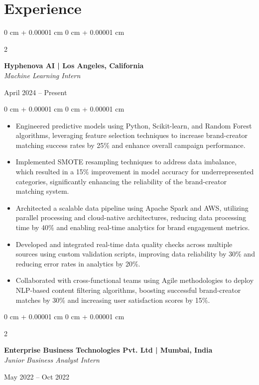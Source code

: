 \documentclass[9pt, letterpaper]{article}
\newenvironment{highlights}{
    \begin{itemize}[
        topsep=0.03 cm,  %
        parsep=0.03 cm,  %
        partopsep=0pt,
        itemsep=0pt,
        leftmargin=0 cm + 8pt %
    ]
    \justifying
}{
    \end{itemize}
}
\newenvironment{onecolentry}{
    \begin{adjustwidth}{
        0 cm + 0.00001 cm
    }{
        0 cm + 0.00001 cm
    }
}{
    \end{adjustwidth}
}
\newenvironment{twocolentry}[2][]{
    \onecolentry
    \def\secondColumn{#2}
    \setcolumnwidth{\fill, 4.3 cm}  %
    \begin{paracol}{2}
}{
    \switchcolumn \raggedleft \secondColumn
    \end{paracol}
    \endonecolentry
}
\begin{document}
\section{Experience}

\begin{twocolentry}{
    April 2024 – Present
}
    \textbf{Hyphenova AI | Los Angeles, California}\\
    \textit{Machine Learning Intern}
\end{twocolentry}

\vspace{0.05 cm}

\begin{onecolentry}
    \begin{highlights}
        \item Engineered predictive models using Python, Scikit-learn, and Random Forest algorithms, leveraging feature selection techniques to increase brand-creator matching success rates by 25\% and enhance overall campaign performance.
        \item Implemented SMOTE resampling techniques to address data imbalance, which resulted in a 15\% improvement in model accuracy for underrepresented categories, significantly enhancing the reliability of the brand-creator matching system.
        \item Architected a scalable data pipeline using Apache Spark and AWS, utilizing parallel processing and cloud-native architectures, reducing data processing time by 40\% and enabling real-time analytics for brand engagement metrics.
        \item Developed and integrated real-time data quality checks across multiple sources using custom validation scripts, improving data reliability by 30\% and reducing error rates in analytics by 20\%.
        \item Collaborated with cross-functional teams using Agile methodologies to deploy NLP-based content filtering algorithms, boosting successful brand-creator matches by 30\% and increasing user satisfaction scores by 15\%.
    \end{highlights}
\end{onecolentry}

\vspace{0.15 cm}

\begin{twocolentry}{
    May 2022 – Oct 2022
}
    \textbf{Enterprise Business Technologies Pvt. Ltd | Mumbai, India}\\
    \textit{Junior Business Analyst Intern}
\end{twocolentry}
\end{document}
